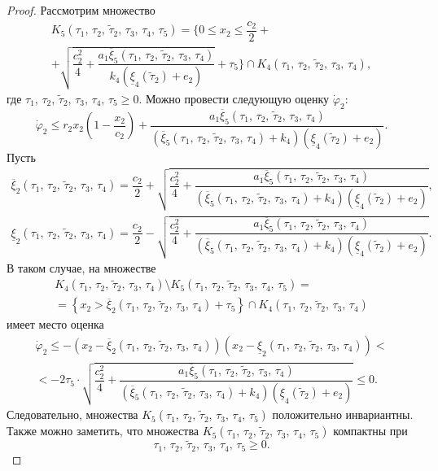 \documentclass[14pt,a4paper]{extarticle}
\begin{document}
\begin{proof}
		Рассмотрим множество 
		\begin{multline*}
			K_5(\tau_1,\,\tau_2,\,\tilde{\tau}_2,\,\tau_3,\,\tau_4,\,\tau_5) = \biggr\{0 \leqslant x_2 \leqslant \dfrac{c_2}{2}+\\
			+\sqrt{\dfrac{c_2^2}{4}+\dfrac{a_1\overline{\xi}_5(\tau_1,\,\tau_2,\,\tilde{\tau}_2,\,\tau_3,\,\tau_4)}{k_4(\underline{\xi}_4(\tilde{\tau}_2)+e_2)}}+\tau_5\biggr\}\cap K_4(\tau_1,\,\tau_2,\,\tilde{\tau}_2,\,\tau_3,\,\tau_4),
		\end{multline*}
		где $\tau_1,\,\tau_2,\,\tilde{\tau}_2,\,\tau_3,\,\tau_4,\,\tau_5 \geqslant 0$.
		Можно провести следующую оценку $\dot{\varphi}_2$:
		\[\dot{\varphi}_2 \leqslant r_2x_2\left(1-\dfrac{x_2}{c_2}\right)+\dfrac{a_1\overline{\xi}_5(\tau_1,\,\tau_2,\,\tilde{\tau}_2,\,\tau_3,\,\tau_4)}{(\overline{\xi}_5(\tau_1,\,\tau_2,\,\tilde{\tau}_2,\,\tau_3,\,\tau_4)+k_4)(\underline{\xi}_4(\tilde{\tau}_2)+e_2)}.\]
		Пусть
		\begin{align*}
			\overline{\xi}_2(\tau_1,\,\tau_2,\,\tilde{\tau}_2,\,\tau_3,\,\tau_4) = \dfrac{c_2}{2}+\sqrt{\dfrac{c_2^2}{4}+\dfrac{a_1\overline{\xi}_5(\tau_1,\,\tau_2,\,\tilde{\tau}_2,\,\tau_3,\,\tau_4)}{(\overline{\xi}_5(\tau_1,\,\tau_2,\,\tilde{\tau}_2,\,\tau_3,\,\tau_4)+k_4)(\underline{\xi}_4(\tilde{\tau}_2)+e_2)}},\\
			\underline{\xi}_2(\tau_1,\,\tau_2,\,\tilde{\tau}_2,\,\tau_3,\,\tau_4) = \dfrac{c_2}{2}-\sqrt{\dfrac{c_2^2}{4}+\dfrac{a_1\overline{\xi}_5(\tau_1,\,\tau_2,\,\tilde{\tau}_2,\,\tau_3,\,\tau_4)}{(\overline{\xi}_5(\tau_1,\,\tau_2,\,\tilde{\tau}_2,\,\tau_3,\,\tau_4)+k_4)(\underline{\xi}_4(\tilde{\tau}_2)+e_2)}}.
		\end{align*}
		В таком случае, на множестве 
		\begin{multline*}
			K_4(\tau_1,\,\tau_2,\,\tilde{\tau}_2,\,\tau_3,\,\tau_4)\setminus K_5(\tau_1,\,\tau_2,\,\tilde{\tau}_2,\,\tau_3,\,\tau_4,\,\tau_5) =\\
			=\left\{x_2 > \overline{\xi}_2(\tau_1,\,\tau_2,\,\tilde{\tau}_2,\,\tau_3,\,\tau_4)+\tau_5\right\}\cap K_4(\tau_1,\,\tau_2,\,\tilde{\tau}_2,\,\tau_3,\,\tau_4)
		\end{multline*}
		имеет место оценка
		\begin{multline*}
			\dot{\varphi}_2 \leqslant -(x_2 - \overline{\xi}_2(\tau_1,\,\tau_2,\,\tilde{\tau}_2,\,\tau_3,\,\tau_4))(x_2 - \underline{\xi}_2(\tau_1,\,\tau_2,\,\tilde{\tau}_2,\,\tau_3,\,\tau_4)) <\\
			< -2\tau_5\cdot\sqrt{\dfrac{c_2^2}{4}+\dfrac{a_1\overline{\xi}_5(\tau_1,\,\tau_2,\,\tilde{\tau}_2,\,\tau_3,\,\tau_4)}{(\overline{\xi}_5(\tau_1,\,\tau_2,\,\tilde{\tau}_2,\,\tau_3,\,\tau_4)+k_4)(\underline{\xi}_4(\tilde{\tau}_2)+e_2)}} \leqslant 0.
		\end{multline*}
		Следовательно, множества $K_5(\tau_1,\,\tau_2,\,\tilde{\tau}_2,\,\tau_3,\,\tau_4,\,\tau_5)$ положительно инвариантны. Также можно заметить, что множества $K_5(\tau_1,\,\tau_2,\,\tilde{\tau}_2,\,\tau_3,\,\tau_4,\,\tau_5)$ компактны при
		\[\tau_1,\,\tau_2,\,\tilde{\tau}_2,\,\tau_3,\,\tau_4,\,\tau_5 \geqslant 0.\]
		

\end{proof}
\end{document}
